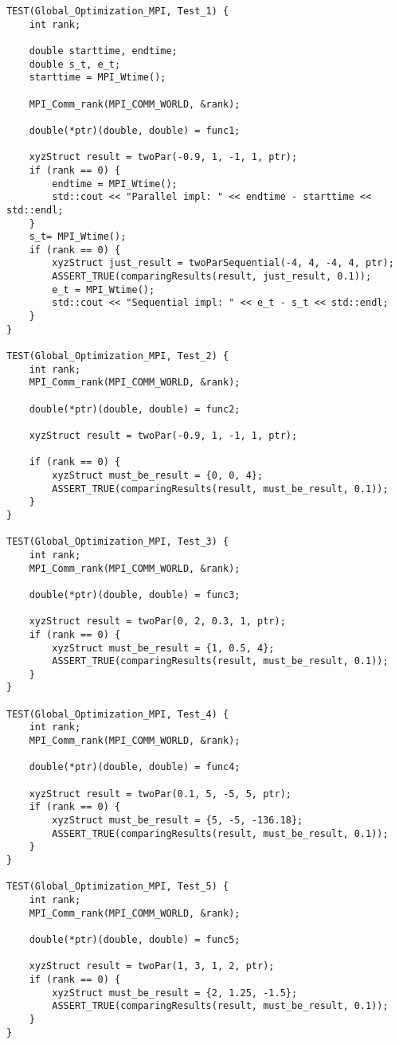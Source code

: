 \documentclass{report}
\begin{document}
\begin{lstlisting}
TEST(Global_Optimization_MPI, Test_1) {
    int rank;

    double starttime, endtime;
    double s_t, e_t;
    starttime = MPI_Wtime();

    MPI_Comm_rank(MPI_COMM_WORLD, &rank);

    double(*ptr)(double, double) = func1;

    xyzStruct result = twoPar(-0.9, 1, -1, 1, ptr);
    if (rank == 0) {
        endtime = MPI_Wtime();
        std::cout << "Parallel impl: " << endtime - starttime << std::endl;
    }
    s_t= MPI_Wtime();
    if (rank == 0) {
        xyzStruct just_result = twoParSequential(-4, 4, -4, 4, ptr);
        ASSERT_TRUE(comparingResults(result, just_result, 0.1));
        e_t = MPI_Wtime();
        std::cout << "Sequential impl: " << e_t - s_t << std::endl;
    }
}

TEST(Global_Optimization_MPI, Test_2) {
    int rank;
    MPI_Comm_rank(MPI_COMM_WORLD, &rank);

    double(*ptr)(double, double) = func2;

    xyzStruct result = twoPar(-0.9, 1, -1, 1, ptr);

    if (rank == 0) {
        xyzStruct must_be_result = {0, 0, 4};
        ASSERT_TRUE(comparingResults(result, must_be_result, 0.1));
    }
}

TEST(Global_Optimization_MPI, Test_3) {
    int rank;
    MPI_Comm_rank(MPI_COMM_WORLD, &rank);

    double(*ptr)(double, double) = func3;

    xyzStruct result = twoPar(0, 2, 0.3, 1, ptr);
    if (rank == 0) {
        xyzStruct must_be_result = {1, 0.5, 4};
        ASSERT_TRUE(comparingResults(result, must_be_result, 0.1));
    }
}

TEST(Global_Optimization_MPI, Test_4) {
    int rank;
    MPI_Comm_rank(MPI_COMM_WORLD, &rank);

    double(*ptr)(double, double) = func4;

    xyzStruct result = twoPar(0.1, 5, -5, 5, ptr);
    if (rank == 0) {
        xyzStruct must_be_result = {5, -5, -136.18};
        ASSERT_TRUE(comparingResults(result, must_be_result, 0.1));
    }
}

TEST(Global_Optimization_MPI, Test_5) {
    int rank;
    MPI_Comm_rank(MPI_COMM_WORLD, &rank);

    double(*ptr)(double, double) = func5;

    xyzStruct result = twoPar(1, 3, 1, 2, ptr);
    if (rank == 0) {
        xyzStruct must_be_result = {2, 1.25, -1.5};
        ASSERT_TRUE(comparingResults(result, must_be_result, 0.1));
    }
}



\end{lstlisting}
\end{document}
